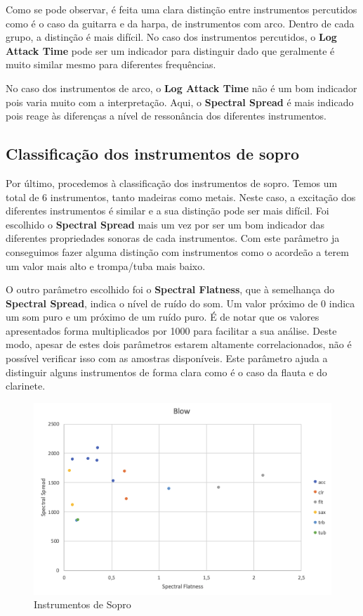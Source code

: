 Como se pode observar, é feita uma clara distinção entre instrumentos percutidos como é o caso da guitarra e da harpa, de instrumentos com arco.
Dentro de cada grupo, a distinção é mais difícil. No caso dos instrumentos percutidos, o \textbf{Log Attack Time} pode ser um indicador para distinguir dado que geralmente é muito similar mesmo para diferentes frequências.

No caso dos instrumentos de arco, o \textbf{Log Attack Time} não é um bom indicador pois varia muito com a interpretação.
Aqui, o \textbf{Spectral Spread} é mais indicado pois reage às diferenças a nível de ressonância dos diferentes instrumentos.


\subsection{Classificação dos instrumentos de sopro}

Por último, procedemos à classificação dos instrumentos de sopro. Temos um total de 6 instrumentos, tanto madeiras como metais.
Neste caso, a excitação dos diferentes instrumentos é similar e a sua distinção pode ser mais difícil.
Foi escolhido o \textbf{Spectral Spread} mais um vez por ser um bom indicador das diferentes propriedades sonoras de cada instrumentos.
Com este parâmetro ja conseguimos fazer alguma distinção com instrumentos como o acordeão a terem um valor mais alto e trompa/tuba mais baixo.

O outro parâmetro escolhido foi o \textbf{Spectral Flatness}, que à semelhança do \textbf{Spectral Spread}, indica o nível de ruído do som.
Um valor próximo de 0 indica um som puro e um próximo de um ruído puro. É de notar que os valores apresentados forma multiplicados por 1000 para facilitar a sua análise.
Deste modo, apesar de estes dois parâmetros estarem altamente correlacionados, não é possível verificar isso com as amostras disponíveis.
Este parâmetro ajuda a distinguir  alguns instrumentos de forma clara como é o caso da flauta e do clarinete.

\begin{figure}[H]
    \centering
    \includegraphics[width=.8\linewidth]{figs/blow_1.png}
    \caption{Instrumentos de Sopro}
    \label{fig:6}
\end{figure}

